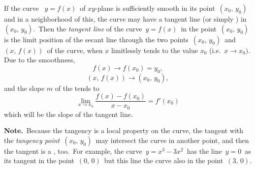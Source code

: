 \documentclass[12pt]{article}
\begin{document}
If the curve \, $y = f(x)$\, of $xy$-plane is sufficiently smooth in its point\, $(x_0,\,y_0)$\, and in a neighborhood of this, the curve may have a tangent line (or simply ) in\, $(x_0,\,y_0)$.\, Then the {\em tangent line} of the curve\, $y = f(x)$\, in the point\, $(x_0,\,y_0)$\, is the limit position of the secant line through the two points\, $(x_0,\,y_0)$\, and\, $(x,\,f(x))$\, of the curve, when $x$ limitlessly tends to the value $x_0$ (i.e.\, $x\to x_0)$.\, Due to the smoothness, 
                   $$f(x)\to f(x_0) = y_0,$$
                 $$(x,\,f(x))\to (x_0,\,y_0),$$
and the slope $m$ of the  tends to
          $$\lim_{x\to x_0}\frac{f(x)\!-\!f(x_0)}{x\!-\!x_0} = f'(x_0)$$
which will be the slope of the tangent line.

\textbf{Note.}\, Because the tangency is a local property on the curve, the tangent with the {\em tangency point}\, $(x_0,\,y_0)$\, may intersect the curve in another point, and then the tangent is a , too.\, For example, the curve\, $y = x^3\!-\!3x^2$\, has the line\, $y = 0$\, as its tangent in the point\, $(0,\,0)$\, but this line  the curve also in the point\, $(3,\,0)$.
\end{document}

